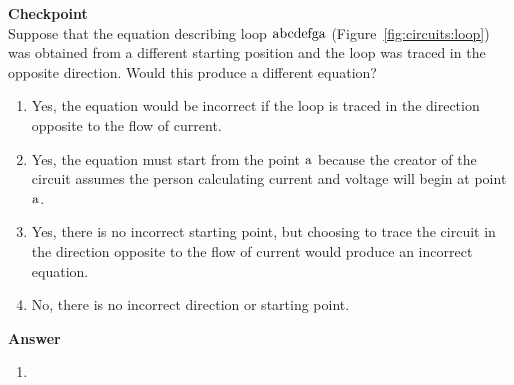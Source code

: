 \begin{framed}
\textbf{Checkpoint}\\
Suppose that the equation describing loop ${\rm abcdefga}$ (Figure~\ref{fig:circuits:loop}) was obtained from a different starting position and the loop was traced in the opposite direction. Would this produce a different equation?

\begin{enumerate}
\item Yes, the equation would be incorrect if the loop is traced in the direction opposite to the flow of current.
\item Yes, the equation must start from the point ${\rm a}$ because the creator of the circuit assumes the person calculating current and voltage will begin at point ${\rm a}$.
\item Yes, there is no incorrect starting point, but choosing to trace the circuit in the direction opposite to the flow of current would produce an incorrect equation.
\item No, there is no incorrect direction or starting point.
\end{enumerate}

\begin{framed}
\textbf{Answer}\\
\begin{enumerate}[resume]
\item
\end{enumerate}
\end{framed}
\end{framed}

